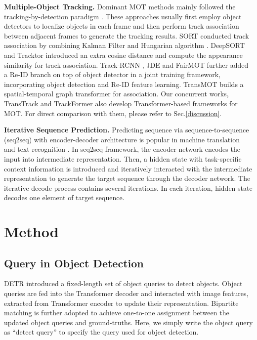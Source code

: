 \documentclass[runningheads]{llncs}
\begin{document}
\noindent \textbf{Multiple-Object Tracking.}
Dominant MOT methods mainly followed the tracking-by-detection paradigm \cite{bewley2016simple,leal2016learning,schulter2017deep,sharma2018beyond,wojke2017simple}. These approaches usually first employ object detectors to localize objects in each frame and then perform track association between adjacent frames to generate the tracking results. SORT \cite{bewley2016simple} conducted track association by combining Kalman Filter \cite{welch1995introduction} and Hungarian algorithm \cite{kuhn1955hungarian}. DeepSORT \cite{wojke2017simple} and Tracktor \cite{bergmann2019twb} introduced an extra cosine distance and compute the appearance similarity for track association. Track-RCNN \cite{shuai2020multi}, JDE \cite{wang2019jde} and FairMOT \cite{zhang2020fairmot} further added a Re-ID branch on top of object detector in a joint training framework, incorporating object detection and Re-ID feature learning. TransMOT \cite{chu2021transmot} builds a spatial-temporal graph transformer for association. Our concurrent works, TransTrack \cite{transtrack} and TrackFormer \cite{Meinhardt2021trackformer} also develop Transformer-based frameworks for MOT. For direct comparison with them, please refer to Sec.\;\ref{discussion}.

\noindent \textbf{Iterative Sequence Prediction.}
Predicting sequence via sequence-to-sequence (seq2seq) with encoder-decoder architecture is popular in machine translation \cite{sutskever2014sequence,vaswani2017attention} and text recognition \cite{shi2016end}. In seq2seq framework, the encoder network encodes the input into intermediate representation. Then, a hidden state with task-specific context information is introduced and iteratively interacted with the intermediate representation to generate the target sequence through the decoder network. The iterative decode process contains several iterations. In each iteration, hidden state decodes one element of target sequence.

\section{Method}
\subsection{Query in Object Detection}
DETR \cite{carion2020detr} introduced a fixed-length set of object queries to detect objects. Object queries are fed into the Transformer decoder and interacted with image features, extracted from Transformer encoder to update their representation. Bipartite matching is further adopted to achieve one-to-one assignment between the updated object queries and ground-truths. Here, we simply write the object query as ``detect query'' to specify the query used for object detection.
\end{document}
